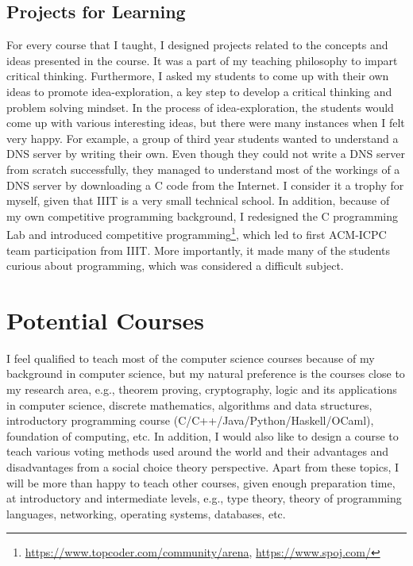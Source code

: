 \documentclass[a4paper]{article}
\begin{document}
\subsection{Projects for Learning}
For every course that I taught, I designed projects related to the concepts 
and ideas presented in the course. It was a part of my teaching philosophy to impart 
critical thinking. Furthermore, I asked my students to come up with their own ideas to 
promote idea-exploration, a key step to develop a critical thinking and problem solving mindset. 
In the process of idea-exploration, the students would come up with various interesting 
ideas, but there were many instances when I felt very happy. For example, a group of third year students  
wanted to understand a DNS server by writing their own. Even though they 
could not write a DNS server from scratch successfully, they managed to understand 
most of the workings of a DNS server by downloading a C code from the Internet. 
I consider it a trophy for myself, given that IIIT is a very small technical school. 
In addition, because of my own 
competitive programming background, 
I redesigned the C programming Lab and introduced competitive 
programming\footnote{\url{https://www.topcoder.com/community/arena}, 
\url{https://www.spoj.com/}}, which led to first ACM-ICPC team participation 
from IIIT. More importantly, it made many of the students curious about 
programming, which was considered a difficult subject.

\section{Potential Courses}
I feel qualified to teach most of the computer science courses 
because of my background in computer science, but 
my natural preference is the courses close to my research 
area, e.g., theorem proving, cryptography, logic 
and its applications in computer science, discrete 
mathematics, algorithms and data structures, 
introductory programming course (C/C++/Java/Python/Haskell/OCaml),
foundation of computing, etc. 
In addition, I would also like to design a course to teach 
various voting methods used around the world and 
their advantages and disadvantages from a social choice theory perspective. 
Apart from these topics, I will 
be more than happy to teach other courses, given enough 
preparation time, at introductory and 
intermediate levels, e.g., type theory, theory of programming 
languages, networking, operating systems, databases, etc.



 

\end{document}
